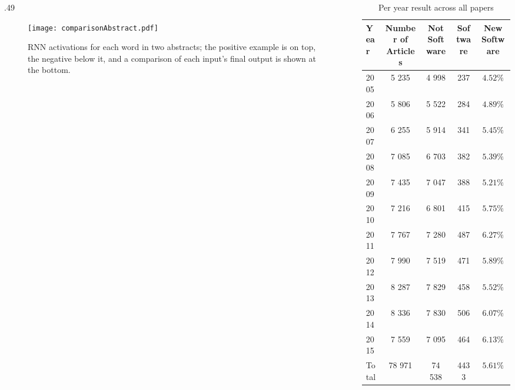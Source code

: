 \documentclass[final]{beamer}
\newlength{\onecolwid}
\begin{document}
\begin{frame}{}
\begin{columns}[t]
\begin{column}{\onecolwid}
\begin{columns}[t,totalwidth=\onecolwid]
	\begin{column}{.49\onecolwid}\vspace{-.6in} %
		\begin{block}{}
			\begin{figure}
				\centering
				\begin{adjustbox}{center}
				\texttt{[image: comparisonAbstract.pdf]}
				\end{adjustbox}
				\caption{RNN activations for each word in two abstracts; the positive example is on top, the negative below it, and a comparison of each input's final output is shown at the bottom.}\label{abstract}
			\end{figure}
		\end{block}
		
	\end{column} 
	
\end{columns}

\end{column} 


\begin{column}{\onecolwid} %
\begin{block}{}
	\begin{table}
		\vspace{2ex}
		\begin{tabular}{|l| cccc|}
			\toprule
			\textbf{Year} & \textbf{\quad  Number of Articles} & \textbf{\quad  Not Software} & \textbf{\quad Software} & \textbf{\quad New Software} \\
			\midrule[2pt]
			2005&	5 235&	4 998&	237&$4.52\%$\\
			2006&	5 806&	5 522&	284&$4.89\%$\\
			2007&	6 255&	5 914&	341&$5.45\%$\\
			2008&	7 085&	6 703&	382	&$5.39\%$\\
			2009&	7 435&	7 047&	388	&$5.21\%$\\
			2010&	7 216&	6 801&	415	&$5.75\%$\\
			2011&	7 767&	7 280&	487	&$6.27\%$\\
			2012&	7 990&	7 519&	471	&$5.89\%$\\
			2013&	8 287&	7 829&	458	&$5.52\%$\\
			2014&	8 336&	7 830&	506	&$6.07\%$\\
			2015&	7 559&	7 095&	464	&$6.13\%$\\
			\midrule[1pt]
			Total & 78 971 &74 538&  4433& $5.61\%$\\
			\bottomrule
		\end{tabular}
		\caption{Per year result across all papers}
	\end{table}
	

\end{block}
\end{column}
\end{columns}
\end{frame}
\end{document}
